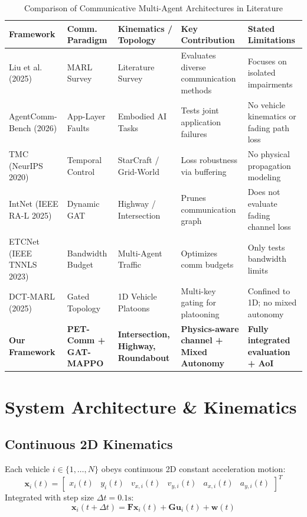 \documentclass[conference]{IEEEtran}
\begin{document}
\begin{table}[t]
\caption{Comparison of Communicative Multi-Agent Architectures in Literature}
\label{tab:lit_review}
\centering
\begin{tabular}{lllll}
\toprule
\textbf{Framework} & \textbf{Comm. Paradigm} & \textbf{Kinematics / Topology} & \textbf{Key Contribution} & \textbf{Stated Limitations} \\
\midrule
Liu et al. (2025) \cite{liu2025robust} & MARL Survey & Literature Survey & Evaluates diverse communication methods & Focuses on isolated impairments \\
AgentComm-Bench (2026) \cite{bansal2026agentcomm} & App-Layer Faults & Embodied AI Tasks & Tests joint application failures & No vehicle kinematics or fading path loss \\
TMC (NeurIPS 2020) \cite{zhang2020tmc} & Temporal Control & StarCraft / Grid-World & Loss robustness via buffering & No physical propagation modeling \\
IntNet (IEEE RA-L 2025) \cite{parada2025intnet} & Dynamic GAT & Highway / Intersection & Prunes communication graph & Does not evaluate fading channel loss \\
ETCNet (IEEE TNNLS 2023) \cite{hu2023etcnet} & Bandwidth Budget & Multi-Agent Traffic & Optimizes comm budgets & Only tests bandwidth limits \\
DCT-MARL (2025) \cite{xu2025dctmarl} & Gated Topology & 1D Vehicle Platoons & Multi-key gating for platooning & Confined to 1D; no mixed autonomy \\
\textbf{Our Framework} & \textbf{PET-Comm + GAT-MAPPO} & \textbf{Intersection, Highway, Roundabout} & \textbf{Physics-aware channel + Mixed Autonomy} & \textbf{Fully integrated evaluation + AoI} \\
\bottomrule
\end{tabular}
\end{table}

\section{System Architecture \& Kinematics}

\subsection{Continuous 2D Kinematics}
Each vehicle $i \in \{1, \dots, N\}$ obeys continuous 2D constant acceleration motion:
\begin{equation}
\mathbf{x}_i(t) = \begin{bmatrix} x_i(t) & y_i(t) & v_{x,i}(t) & v_{y,i}(t) & a_{x,i}(t) & a_{y,i}(t) \end{bmatrix}^T
\end{equation}
Integrated with step size $\Delta t = 0.1\text{s}$:
\begin{equation}
\mathbf{x}_i(t + \Delta t) = \mathbf{F} \mathbf{x}_i(t) + \mathbf{G} \mathbf{u}_i(t) + \mathbf{w}(t)
\end{equation}
\end{document}
